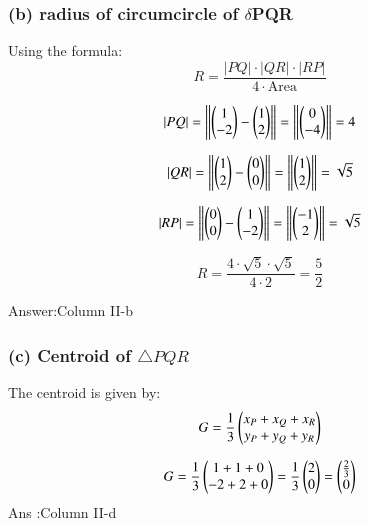 \documentclass[article]{IEEEtran}
\begin{document}
\subsubsection*{(b) radius of circumcircle of $\delta$PQR}
Using the formula:
\begin{equation}
	R = \frac{|PQ| \cdot |QR| \cdot |RP|}{4 \cdot \text{Area}}
\end{equation}

\begin{equation}
	|PQ| = \left\|\begin{pmatrix}1\\-2\end{pmatrix} - \begin{pmatrix}1\\2\end{pmatrix}\right\| = \left\|\begin{pmatrix}0\\-4\end{pmatrix}\right\| = 4
\end{equation}

\begin{equation}
	|QR| = \left\|\begin{pmatrix}1\\2\end{pmatrix} - \begin{pmatrix}0\\0\end{pmatrix}\right\| = \left\|\begin{pmatrix}1\\2\end{pmatrix}\right\| = \sqrt{5}
\end{equation}

\begin{equation}
	|RP| = \left\|\begin{pmatrix}0\\0\end{pmatrix} - \begin{pmatrix}1\\-2\end{pmatrix}\right\| = \left\|\begin{pmatrix}-1\\2\end{pmatrix}\right\| =\sqrt{5}
\end{equation}

\begin{equation}
	R = \frac{4 \cdot \sqrt{5} \cdot \sqrt{5}}{4 \cdot 2} = \frac{5}{2}
\end{equation}

Answer:Column II-b

\subsubsection*{(c) Centroid of $\triangle PQR$}

The centroid is given by:
\begin{equation}
	G = \frac{1}{3}\begin{pmatrix}x_P + x_Q + x_R\\y_P + y_Q + y_R\end{pmatrix}
\end{equation}

\begin{equation}
	G = \frac{1}{3}\begin{pmatrix}1 + 1 + 0\\-2 + 2 + 0\end{pmatrix} = \frac{1}{3}\begin{pmatrix}2\\0\end{pmatrix} = \begin{pmatrix}\frac{2}{3}\\0\end{pmatrix}
\end{equation}
Ans :Column II-d
\end{document}
